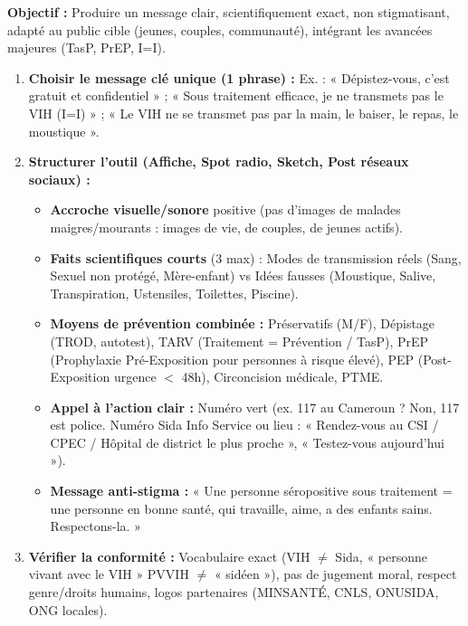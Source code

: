 \documentclass[11pt]{article}
\begin{document}
\begin{methode}[Construire un outil de sensibilisation : Dépistage, Prévention, Lutte contre la stigmatisation (I=I)]
\textbf{Objectif :} Produire un message clair, scientifiquement exact, non stigmatisant, adapté au public cible (jeunes, couples, communauté), intégrant les avancées majeures (TasP, PrEP, I=I).
\begin{enumerate}
    \item \textbf{Choisir le message clé unique (1 phrase) :} Ex. : « Dépistez-vous, c'est gratuit et confidentiel » ; « Sous traitement efficace, je ne transmets pas le VIH (I=I) » ; « Le VIH ne se transmet pas par la main, le baiser, le repas, le moustique ».
    \item \textbf{Structurer l'outil (Affiche, Spot radio, Sketch, Post réseaux sociaux) :}
    \begin{itemize}
        \item \textbf{Accroche visuelle/sonore} positive (pas d'images de malades maigres/mourants : images de vie, de couples, de jeunes actifs).
        \item \textbf{Faits scientifiques courts} (3 max) : Modes de transmission réels (Sang, Sexuel non protégé, Mère-enfant) vs Idées fausses (Moustique, Salive, Transpiration, Ustensiles, Toilettes, Piscine).
        \item \textbf{Moyens de prévention combinée :} Préservatifs (M/F), Dépistage (TROD, autotest), TARV (Traitement = Prévention / TasP), PrEP (Prophylaxie Pré-Exposition pour personnes à risque élevé), PEP (Post-Exposition urgence $<$ 48h), Circoncision médicale, PTME.
        \item \textbf{Appel à l'action clair :} Numéro vert (ex. 117 au Cameroun ? Non, 117 est police. Numéro Sida Info Service ou lieu : « Rendez-vous au CSI / CPEC / Hôpital de district le plus proche », « Testez-vous aujourd'hui »).
        \item \textbf{Message anti-stigma :} « Une personne séropositive sous traitement = une personne en bonne santé, qui travaille, aime, a des enfants sains. Respectons-la. »
    \end{itemize}
    \item \textbf{Vérifier la conformité :} Vocabulaire exact (VIH $\neq$ Sida, « personne vivant avec le VIH » PVVIH $\neq$ « sidéen »), pas de jugement moral, respect genre/droits humains, logos partenaires (MINSANTÉ, CNLS, ONUSIDA, ONG locales).
\end{enumerate}
\end{methode}
\end{document}
